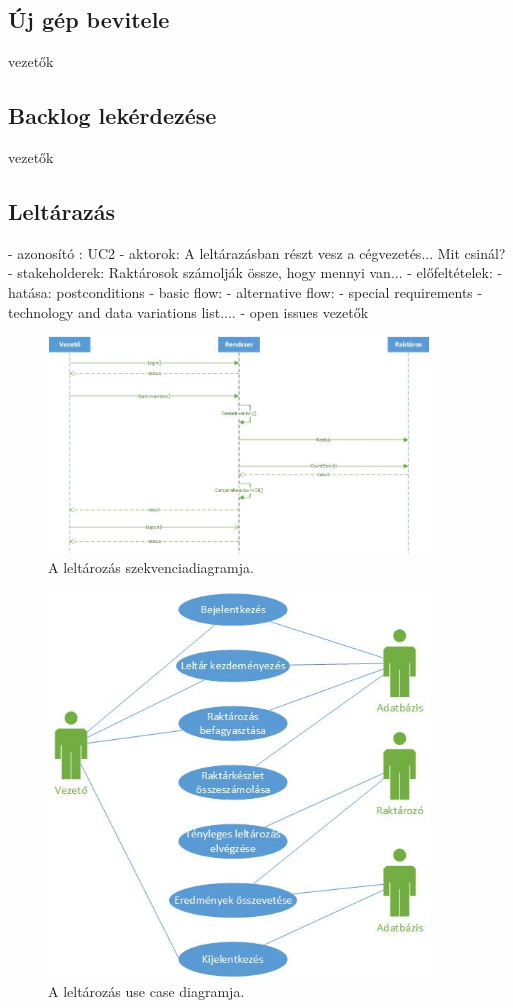 \documentclass[11pt]{article}\usepackage[left=20mm,right=20mm,top=15mm,bottom=20mm]{geometry}
\begin{document}
\subsection{Új gép bevitele}
vezetők

\subsection{Backlog lekérdezése}
vezetők

\subsection{Leltárazás}
- azonosító : UC2
- aktorok: A leltárazásban részt vesz a cégvezetés... Mit csinál?
- stakeholderek: Raktárosok számolják össze, hogy mennyi van...
- előfeltételek:
- hatása: postconditions
- basic flow:
- alternative flow:
- special requirements
- technology and data variations list.... 
- open issues
vezetők

\begin{figure}[!h]
    \centering
        \includegraphics[width=0.9\textwidth]{figures/leltarazas_SD.jpg}
        \caption{A leltározás szekvenciadiagramja.}
\end{figure}

\begin{figure}[!h]
    \centering
        \includegraphics[width=0.9\textwidth]{figures/leltarazas_UC.jpg}
        \caption{A leltározás use case diagramja.}
\end{figure}
\end{document}
